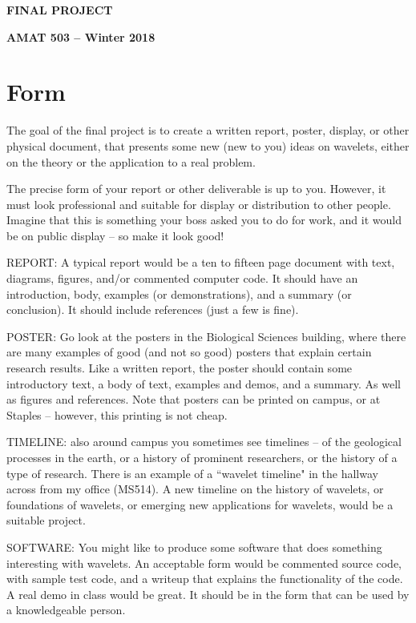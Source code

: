 \documentclass[12pt]{article}
\begin{document}
\pagestyle{empty}



\begin{center}
{\bf FINAL PROJECT  }

{\bf AMAT 503 -- Winter 2018 } 


\end{center}

\vskip 5mm

\section{Form}

The goal of the final project is to create a written report, poster, display, or other physical document, that presents some new (new to you) ideas on wavelets, either on the theory or the application to a real problem.

The precise form of your report or other deliverable is up to you. However, it must look professional and suitable for display or distribution to other people. Imagine that this is something your boss asked you to do for work, and it would be on public display -- so make it look good!

REPORT: A typical report would be a ten to fifteen page document with text, diagrams, figures, and/or commented computer code. It should have an introduction, body, examples (or demonstrations), and a summary (or conclusion). It should include references (just a few is fine).

POSTER: Go look at the posters in the Biological Sciences building, where there are many examples of good (and not so good) posters that explain certain research results. Like a written report, the poster should contain some introductory text, a body of text, examples and demos, and a summary. As well as figures and references. Note that posters can be printed on campus, or at Staples -- however, this printing is not cheap.

TIMELINE: also around campus you sometimes see timelines -- of the geological processes in the earth, or a history of prominent researchers, or the history of a type of research. There is an example of a ``wavelet timeline" in the hallway across from my office (MS514).  A new timeline on the history of wavelets, or foundations of wavelets, or emerging new applications for wavelets, would be a suitable project.

SOFTWARE: You might like to produce some software that does something interesting with wavelets. An acceptable form would be commented source code, with sample test code, and a writeup that explains the functionality of the code. A real demo in class would be great. It should be in the form that can be used by a knowledgeable person. 
\end{document}
